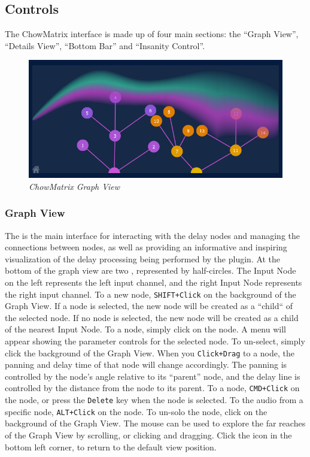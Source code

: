 \documentclass[landscape,twocolumn,a5paper]{manual}
\newcommand\shortcut[1]{\colorbox{highlightcolour}{\texttt{#1}}}
\begin{document}
\subsection{Controls}
The ChowMatrix interface is made up of four main sections:
the ``Graph View'', ``Details View'', ``Bottom Bar''
and ``Insanity Control''.

\begin{figure}[ht]
    \center
    \includegraphics[width=0.8\columnwidth]{screenshots/GraphView.png}
    \caption{\label{fig:graph_view}{\it ChowMatrix Graph View}}
\end{figure}

\subsubsection{Graph View}
The  is the main interface for interacting
with the delay nodes and managing the connections between nodes,
as well as providing an informative and inspiring visualization
of the delay processing being performed by the plugin.
\newpar
At the bottom of the graph view are two ,
represented by half-circles. The Input Node on the left represents
the left input channel, and the right Input Node represents the right
input channel.
\newpar
To  a new
node, \shortcut{SHIFT+Click} on the background of the Graph
View. If a node is selected, the new node will be created
as a ``child`` of the selected node. If no node is selected,
the new node will be created as a child of the nearest Input
Node.
\newpar
To  a node, simply click on the node. A menu
will appear showing the parameter controls for the selected node.
To un-select, simply click the background of the Graph View.
\newpar
When you \shortcut{Click+Drag} to  a node,
the panning and delay time of that node will change accordingly.
The panning is controlled by the node's angle relative to its
``parent'' node, and the delay line is controlled by the distance
from the node to its parent.
\newpar
To  a node,
\shortcut{CMD+Click} on the node, or press the \shortcut{Delete}
key when the node is selected.
\newpar
To  the audio from a specific node,
\shortcut{ALT+Click} on the node. To un-solo the node,
click on the background of the Graph View.
\newpar
The mouse can be used to explore the far reaches of the
Graph View by scrolling, or clicking and dragging. Click
the  icon in the bottom left corner, to
return to the default view position.
\end{document}
